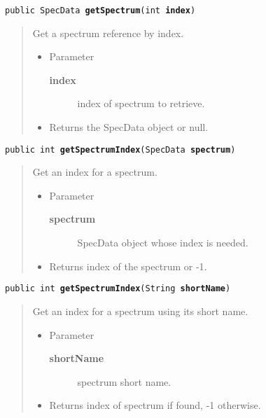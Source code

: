 \documentclass[twoside,11pt,nolof]{starlink}
\providecommand{\method}[1]{\texttt{#1}}
\newenvironment{desc}{\begin{quote}}{\end{quote}}
\begin{document}
\method{public SpecData \textbf{getSpectrum}(\texttt{int} \textbf{index})\label{l293}\label{l294}}
\begin{desc}Get a spectrum reference by index.
\begin{itemize}
\item{Parameter
  \begin{description}
   \item[\textbf{index}]{index of spectrum to retrieve.}
  \end{description}}
\end{itemize}
\begin{itemize}
\item{Returns the SpecData object or null. }
\end{itemize}
\end{desc}

\method{public int \textbf{getSpectrumIndex}(\texttt{SpecData} \textbf{spectrum})\label{l295}\label{l296}}
\begin{desc}Get an index for a spectrum.
\begin{itemize}
\item{Parameter
  \begin{description}
   \item[\textbf{spectrum}]{SpecData object whose index is needed.}
  \end{description}}
\end{itemize}
\begin{itemize}
\item{Returns index of the spectrum or -1. }
\end{itemize}
\end{desc}

\method{public int \textbf{getSpectrumIndex}(\texttt{String} \textbf{shortName})\label{l297}\label{l298}}
\begin{desc}Get an index for a spectrum using its short name.
\begin{itemize}
\item{Parameter
  \begin{description}
   \item[\textbf{shortName}]{spectrum short name.}
  \end{description}}
\end{itemize}
\begin{itemize}
\item{Returns index of spectrum if found, -1 otherwise. }
\end{itemize}
\end{desc}
\end{document}
